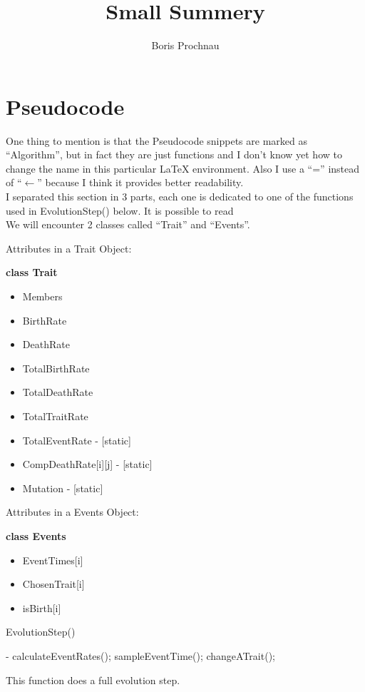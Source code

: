 \documentclass{article}
\title{Small Summery}
\author{Boris Prochnau}
\begin{document}
\maketitle

\section{Pseudocode}
One thing to mention is that the Pseudocode snippets are marked as "`Algorithm"', but in fact they are just functions and I don’t know yet how to change the name in this particular LaTeX environment. Also I use a "`="' instead of "`$\leftarrow$"' because I think it provides better readability.\\
I separated this section in 3 parts, each one is dedicated to one of the functions used in EvolutionStep() below. It is possible to read \\
We will encounter 2 classes called "`Trait"' and "`Events"'.\\

\begin{minipage}[t]{0.5\textwidth}
Attributes in a Trait Object:\\
	\textcolor[rgb]{0,0,0.55}{
	\textbf{class Trait}
	\begin{itemize}
		\item Members
		\item BirthRate
		\item DeathRate
		\item TotalBirthRate
		\item TotalDeathRate
		\item TotalTraitRate
		\item TotalEventRate - [static]
		\item CompDeathRate[i][j] - [static]
		\item Mutation - [static]
	\end{itemize}
	}
\end{minipage}
\begin{minipage}[t]{0.5\textwidth}
Attributes in a Events Object:\\
	\textcolor[rgb]{0,0,0.55}{\textbf{class Events}
	\begin{itemize}
		\item EventTimes[i]
		\item ChosenTrait[i]
		\item isBirth[i]
	\end{itemize}
	}
\end{minipage}


\begin{algorithm}[H]
	\caption{EvolutionStep()}
	\begin{algorithmic}[1]
		\REQUIRE -
		\STATE calculateEventRates();
		\STATE sampleEventTime();
		\STATE changeATrait();
	\end{algorithmic}
\end{algorithm}
This function does a full evolution step.
\end{document}
